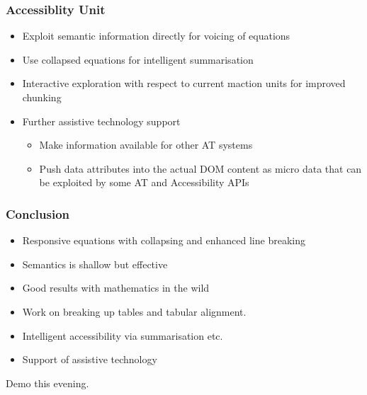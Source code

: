 \documentclass{beamer}
\begin{document}
\begin{frame}
  \frametitle{Accessiblity Unit}
  \begin{itemize}
  \item Exploit semantic information directly for voicing of equations
  \item Use collapsed equations for intelligent summarisation
  \item Interactive exploration with respect to current maction units
    for improved chunking
  \item {Further assistive technology support}
 \begin{itemize}
  \item Make information available for other AT systems
  \item Push data attributes into the actual DOM content as micro data that can
    be exploited by some AT and  Accessibility APIs
  \end{itemize}

  \end{itemize}
\end{frame}



\begin{frame}
  \frametitle{Conclusion}
  \begin{itemize}
  \item Responsive equations with collapsing and enhanced line breaking
  \item Semantics is shallow but effective
  \item Good results with mathematics in the wild
  \end{itemize}

  \begin{itemize}
  \item Work on breaking up tables and tabular alignment.
  \item Intelligent accessibility via summarisation etc.
  \item Support of assistive technology
  \end{itemize}

  Demo this evening.
\end{frame}
\end{document}
